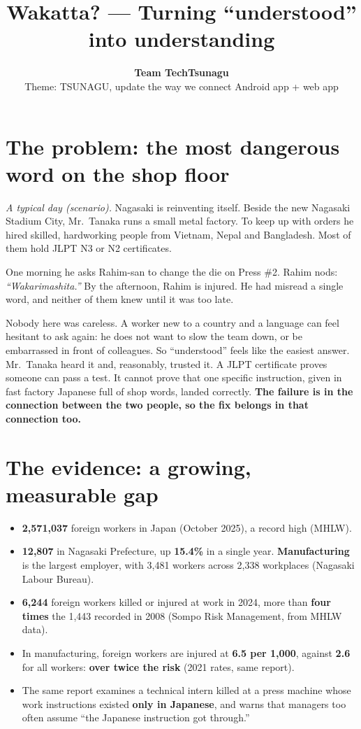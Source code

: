 \documentclass[11pt,a4paper]{article}
\title{\textbf{Wakatta? --- Turning ``understood'' into understanding}}
\author{\textbf{Team TechTsunagu}\\[2pt]
\small Theme: TSUNAGU, update the way we connect \textperiodcentered{} Android app + web app}
\date{}
\begin{document}
\maketitle
\thispagestyle{fancy}

\section{The problem: the most dangerous word on the shop floor}

\textit{A typical day (scenario).} Nagasaki is reinventing itself. Beside the new Nagasaki Stadium City, Mr.~Tanaka runs a small metal factory. To keep up with orders he hired skilled, hardworking people from Vietnam, Nepal and Bangladesh. Most of them hold JLPT N3 or N2 certificates.

One morning he asks Rahim-san to change the die on Press \#2. Rahim nods: \textit{``Wakarimashita.''} By the afternoon, Rahim is injured. He had misread a single word, and neither of them knew until it was too late.

Nobody here was careless. A worker new to a country and a language can feel hesitant to ask again: he does not want to slow the team down, or be embarrassed in front of colleagues. So ``understood'' feels like the easiest answer. Mr.~Tanaka heard it and, reasonably, trusted it. A JLPT certificate proves someone can pass a test. It cannot prove that one specific instruction, given in fast factory Japanese full of shop words, landed correctly. \textbf{The failure is in the connection between the two people, so the fix belongs in that connection too.}

\section{The evidence: a growing, measurable gap}

\begin{itemize}
  \item \textbf{2,571,037} foreign workers in Japan (October 2025), a record high (MHLW).
  \item \textbf{12,807} in Nagasaki Prefecture, up \textbf{15.4\%} in a single year. \textbf{Manufacturing} is the largest employer, with 3,481 workers across 2,338 workplaces (Nagasaki Labour Bureau).
  \item \textbf{6,244} foreign workers killed or injured at work in 2024, more than \textbf{four times} the 1,443 recorded in 2008 (Sompo Risk Management, from MHLW data).
  \item In manufacturing, foreign workers are injured at \textbf{6.5 per 1,000}, against \textbf{2.6} for all workers: \textbf{over twice the risk} (2021 rates, same report).
  \item The same report examines a technical intern killed at a press machine whose work instructions existed \textbf{only in Japanese}, and warns that managers too often assume ``the Japanese instruction got through.''
\end{itemize}
\end{document}
